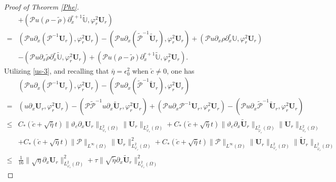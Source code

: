 \documentclass{amsart}
\numberwithin{equation}{section}
\begin{document}
\begin{proof}[Proof of Theorem \ref{Phe}]
\begin{align}
 &+(\mathcal{P}u(\rho-\tilde{\rho})\partial_{x}^{r+1}\tilde{\mathbb{U}},\varphi_{r}^{2}\mathbf{U}_{r})\nonumber\\
=& (\mathcal{P}u\partial_{x}(\mathcal{P}^{-1}\mathbf{U}_{r}),\varphi_{r}^{2}\mathbf{U}_{r})
  -(\mathcal{P}u\partial_{x}(\tilde{\mathcal{P}}^{-1}\tilde{\mathbf{U}}_{r}),\varphi_{r}^{2}\mathbf{U}_{r})
  +(\mathcal{P}u\partial_{x}\rho\partial_{x}^{r}\mathbb{U},\varphi_{r}^{2}\mathbf{U}_{r})\nonumber\\
 &-(\mathcal{P}u\partial_{x}\tilde{\rho}\partial_{x}^{r}\tilde{\mathbb{U}},\varphi_{r}^{2}\mathbf{U}_{r})
  +(\mathcal{P}u(\rho-\tilde{\rho})\partial_{x}^{r+1}\tilde{\mathbb{U}},\varphi_{r}^{2}\mathbf{U}_{r}).\nonumber
\end{align}
Utilizing \eqref{us-3}, and recalling that $\bar{\eta}=\epsilon_{0}^{2}$ when $\check{c}\neq0$, one has
\begin{align}\label{JJ111}
 &(\mathcal{P}u\partial_{x}(\mathcal{P}^{-1}\mathbf{U}_{r}),\varphi_{r}^{2}\mathbf{U}_{r})
-(\mathcal{P}u\partial_{x}(\tilde{\mathcal{P}}^{-1}\tilde{\mathbf{U}}_{r}),\varphi_{r}^{2}\mathbf{U}_{r})\\
=& (u\partial_{x}\mathbf{U}_{r},\varphi_{r}^{2}\mathbf{U}_{r})
  -(\mathcal{P}\tilde{\mathcal{P}}^{-1}u\partial_{x}\tilde{\mathbf{U}}_{r},\varphi_{r}^{2}\mathbf{U}_{r})
  +(\mathcal{P}u\partial_{x}\mathcal{P}^{-1}\mathbf{U}_{r},\varphi_{r}^{2}\mathbf{U}_{r})
  -(\mathcal{P}u\partial_{x}\tilde{\mathcal{P}}^{-1}\tilde{\mathbf{U}}_{r},\varphi_{r}^{2}\mathbf{U}_{r})\nonumber\\
\leq& C_{*}(\check{c}+\sqrt{\bar{\eta}}t)\|\vartheta_{c}\partial_{x}\mathbf{U}_{r}\|_{L_{\varphi_{r}}^{2}(\Omega)}
                                             \|\mathbf{U}_{r}\|_{L_{\varphi_{r}}^{2}(\Omega)}
     +C_{*}(\check{c}+\sqrt{\bar{\eta}}t)\|\vartheta_{c}\partial_{x}\tilde{\mathbf{U}}_{r}\|_{L_{\tilde{\varphi}_{r}}^{2}(\Omega)}\|\mathbf{U}_{r}\|_{L_{\varphi_{r}}^{2}(\Omega)}\nonumber\\
    &+C_{*}(\check{c}+\sqrt{\bar{\eta}}t)\|\mathcal{P}\|_{L^{\infty}(\Omega)}\|\mathbf{U}_{r}\|_{L_{\varphi_{r}}^{2}(\Omega)}^{2}
     +C_{*}(\check{c}+\sqrt{\bar{\eta}}t)\|\mathcal{P}\|_{L^{\infty}(\Omega)}\|\mathbf{U}_{r}\|_{L_{\varphi_{r}}^{2}(\Omega)}
                                             \|\tilde{\mathbf{U}}_{r}\|_{L_{\tilde{\varphi}_{r}}^{2}(\Omega)}\nonumber\\
\leq& \frac{1}{16}\|\sqrt{\eta}\partial_{x}\mathbf{U}_{r}\|_{L_{\varphi_{r}}^{2}(\Omega)}^{2}
     +\tau\|\sqrt{\tilde{\eta}}\partial_{x}\tilde{\mathbf{U}}_{r}\|_{L_{\varphi_{r}}^{2}(\Omega)}^{2}

\end{align}
\end{proof}
\end{document}
